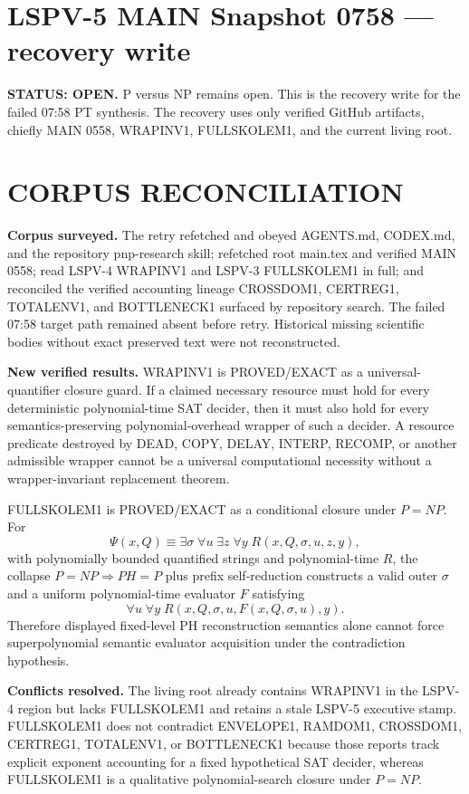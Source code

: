 \documentclass[11pt]{article}
\begin{document}
\section*{LSPV-5 MAIN Snapshot 0758 --- recovery write}
\textbf{STATUS: OPEN.} P versus NP remains open. This is the recovery write for the failed 07:58 PT synthesis. The recovery uses only verified GitHub artifacts, chiefly MAIN 0558, WRAPINV1, FULLSKOLEM1, and the current living root.

\section*{CORPUS RECONCILIATION}
\textbf{Corpus surveyed.}
The retry refetched and obeyed AGENTS.md, CODEX.md, and the repository pnp-research skill; refetched root main.tex and verified MAIN 0558; read LSPV-4 WRAPINV1 and LSPV-3 FULLSKOLEM1 in full; and reconciled the verified accounting lineage CROSSDOM1, CERTREG1, TOTALENV1, and BOTTLENECK1 surfaced by repository search. The failed 07:58 target path remained absent before retry. Historical missing scientific bodies without exact preserved text were not reconstructed.

\textbf{New verified results.}
WRAPINV1 is PROVED/EXACT as a universal-quantifier closure guard. If a claimed necessary resource must hold for every deterministic polynomial-time SAT decider, then it must also hold for every semantics-preserving polynomial-overhead wrapper of such a decider. A resource predicate destroyed by DEAD, COPY, DELAY, INTERP, RECOMP, or another admissible wrapper cannot be a universal computational necessity without a wrapper-invariant replacement theorem.

FULLSKOLEM1 is PROVED/EXACT as a conditional closure under \(P=NP\). For
\[
\Psi(x,Q)\equiv
\exists \sigma\;\forall u\;\exists z\;\forall y\;
R(x,Q,\sigma,u,z,y),
\]
with polynomially bounded quantified strings and polynomial-time \(R\), the collapse \(P=NP\Rightarrow PH=P\) plus prefix self-reduction constructs a valid outer \(\sigma\) and a uniform polynomial-time evaluator \(F\) satisfying
\[
\forall u\;\forall y\;
R(x,Q,\sigma,u,F(x,Q,\sigma,u),y).
\]
Therefore displayed fixed-level PH reconstruction semantics alone cannot force superpolynomial semantic evaluator acquisition under the contradiction hypothesis.

\textbf{Conflicts resolved.}
The living root already contains WRAPINV1 in the LSPV-4 region but lacks FULLSKOLEM1 and retains a stale LSPV-5 executive stamp. FULLSKOLEM1 does not contradict ENVELOPE1, RAMDOM1, CROSSDOM1, CERTREG1, TOTALENV1, or BOTTLENECK1 because those reports track explicit exponent accounting for a fixed hypothetical SAT decider, whereas FULLSKOLEM1 is a qualitative polynomial-search closure under \(P=NP\).
\end{document}
